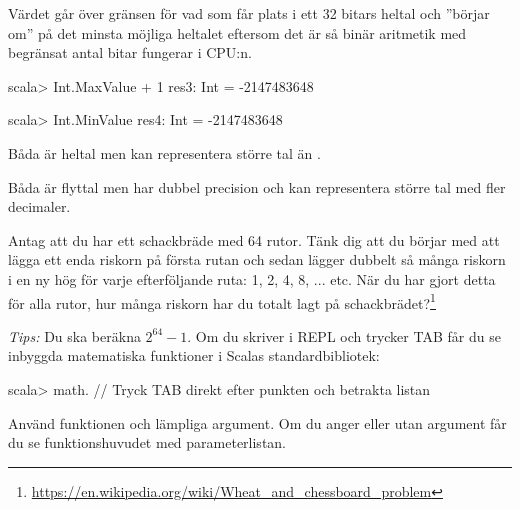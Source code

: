 \SOLUTION

\TaskSolved \what

\SubtaskSolved

\begin{ConceptConnections}

\end{ConceptConnections}

\SubtaskSolved Värdet går över gränsen för vad som får plats i ett 32 bitars heltal och ''börjar om'' på det minsta möjliga heltalet  eftersom det är så binär aritmetik med begränsat antal bitar fungerar i CPU:n.
\begin{REPL}
scala> Int.MaxValue + 1
res3: Int = -2147483648

scala> Int.MinValue
res4: Int = -2147483648
\end{REPL}

\SubtaskSolved Båda är heltal men  kan representera större tal än .

\SubtaskSolved Båda är flyttal men  har dubbel precision och kan representera större tal med fler decimaler.



\QUESTEND






\QUESTBEGIN

\Task \what

\Subtask Antag att du har ett schackbräde med 64 rutor. Tänk dig att du börjar med att lägga ett enda riskorn på första rutan och sedan 
lägger dubbelt så många riskorn i en ny hög för varje efterföljande ruta: 1, 2, 4, 8, ...  etc. När du har gjort detta för alla rutor, 
hur många riskorn har du totalt lagt på schackbrädet?\footnote{\url{https://en.wikipedia.org/wiki/Wheat_and_chessboard_problem}}

\emph{Tips:} Du ska beräkna $2^{64} - 1$. Om du skriver  i REPL och trycker TAB får du se inbyggda matematiska funktioner i Scalas standardbibliotek:
\begin{REPLnonum}
scala> math.    // Tryck TAB direkt efter punkten och betrakta listan
\end{REPLnonum}
Använd funktionen  och lämpliga argument. Om du anger  eller  utan argument får du se funktionshuvudet med 
parameterlistan.

